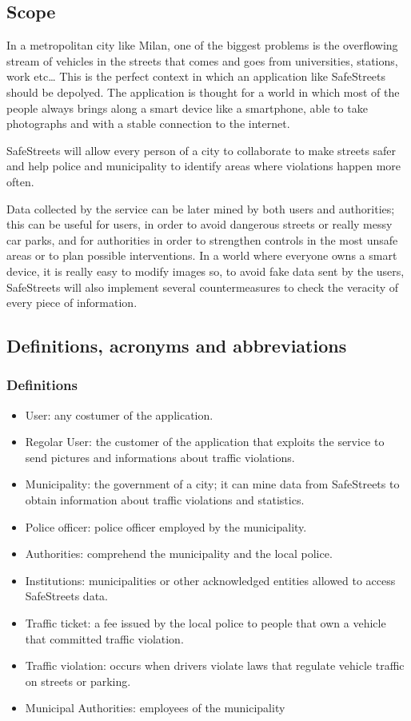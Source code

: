\subsection{Scope}
In a metropolitan city like Milan, one of the biggest problems is the overflowing stream of vehicles in the streets that comes and goes from universities, stations, work etc…  \newline
This is the perfect context in which an application like SafeStreets should be depolyed.  \newline
The application is thought for a world in which most of the people always brings along a smart device like a smartphone, able to take photographs and with a stable connection to the internet.  \newline\par
SafeStreets will allow every person of a city to collaborate to make streets safer and help police and municipality to identify areas where violations happen more often.  \newline\par
Data collected by the service can be later mined by both users and authorities; this can be useful for users, in order to avoid dangerous streets or really messy car parks, and for authorities in order to strengthen controls in the most unsafe areas or to plan possible interventions.  \newline
In a world where everyone owns a smart device, it is really easy to modify images so, to avoid fake data sent by the users, SafeStreets will also implement several countermeasures to check the veracity of every piece of information. 
\subsection{Definitions, acronyms and abbreviations }
\subsubsection{Definitions}
\begin{itemize}
	\item User: any costumer of the application.
	\item Regolar User: the customer of the application that exploits the service to send pictures and informations about traffic violations. 
	\item Municipality: the government of a city; it can mine data from SafeStreets to obtain information about traffic violations and statistics.
	\item Police officer: police officer employed by the municipality.
	\item Authorities: comprehend the municipality and the local police.
	\item Institutions: municipalities or other acknowledged entities allowed to access SafeStreets data. 
	\item Traffic ticket: a fee issued by the local police to people that own a vehicle that committed traffic violation. 
	\item Traffic violation: occurs when drivers violate laws that regulate vehicle traffic on streets or parking. 
	\item Municipal Authorities: employees of the municipality 
\end{itemize}
